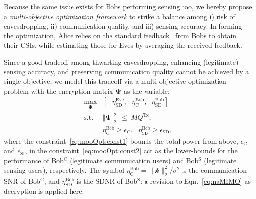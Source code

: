 \documentclass[conference,compsoc]{IEEEtran}
\begin{document}
%
%
Because the same issue exists for Bobs performing sensing too,
we hereby propose a \textit{multi-objective optimization framework} to strike a balance among i) risk of eavesdropping, ii) communication quality, and iii) sensing accuracy. In forming the optimization, Alice relies on the standard feedback~\cite{ieee80211ax} from Bobs to obtain their CSIs, while estimating those for Eves by averaging the received feedback.



%
Since a good tradeoff among thwarting eavesdropping, enhancing (legitimate) sensing accuracy, and preserving communication quality cannot be achieved by a single objective, 
we model this tradeoff via a multi-objective optimization problem with the encryption matrix $\bm{\Psi}$ as the variable:
%
\begin{align} \label{eq:mooOpt}
	\max_{\bm{ \Psi }} & \left[ -\eta_{\mathrm{SD}}^{\mathrm{Eve}},~~~\eta_{\mathrm{C}}^{\mathrm{Bob}},~~~\eta_{\mathrm{SD}}^{\mathrm{Bob}} \right] \\
	\mathrm{s.t.}~~& \Vert \bm{\Psi}   \Vert_2^2 ~~\le~ M  Q^{\mathrm{Tx}} , \label{eq:mooOpt:const1} \\
	& \eta_{\mathrm{C}}^{\mathrm{Bob}} \ge \epsilon_{\mathrm{C}}, ~~~\eta_{\mathrm{SD}}^{\mathrm{Bob}} \ge \epsilon_{\mathrm{SD}}, \label{eq:mooOpt:const2}
\end{align}
%
where the constraint~\eqref{eq:mooOpt:const1} bounds the total power from above, $\epsilon_{\mathrm{C}}$ and $\epsilon_{\mathrm{SD}}$ in the constraint~\eqref{eq:mooOpt:const2} act as the lower-bounds for the performance of Bob$^{\mathrm{C}}$ (legitimate communication users) and Bob$^{\mathrm{S}}$ (legitimate sensing users), respectively. 
%
The symbol $\eta_{\mathrm{C}}^{\mathrm{Bob}} = \| \hat{\bm{\mathcal{h}}}  \|_2^2 / \sigma^2 $ is the communication SNR of Bob$^{\mathrm{C}}$, and $\eta_{\mathrm{SD}}^{\mathrm{Bob}} $ is the SDNR of Bob$^{\mathrm{S}}$: a revision to Eqn.~\eqref{eq:naMIMO} as decryption is applied here:
\end{document}
